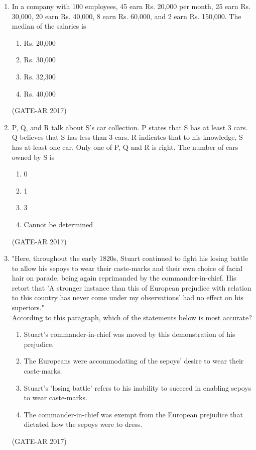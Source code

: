 \documentclass[a4paper,10pt]{article}
\begin{document}
\begin{enumerate}
    \item In a company with 100 employees, 45 earn Rs. 20,000 per month, 25 earn Rs. 30,000, 20 earn Rs. 40,000, 8 earn Rs. 60,000, and 2 earn Rs. 150,000. The median of the salaries is 
    \begin{multicols}{4}
	\begin{enumerate}
        \item Rs. 20,000
        \item Rs. 30,000
        \item Rs. 32,300
        \item Rs. 40,000
    \end{enumerate}
	\end{multicols}
    \hfill (GATE-AR 2017)

    \item P, Q, and R talk about S's car collection. P states that S has at least 3 cars. Q believes that S has less than 3 cars. R indicates that to his knowledge, S has at least one car. Only one of P, Q and R is right. The number of cars owned by S is 
    \begin{multicols}{4}
	\begin{enumerate}
        \item 0
        \item 1
        \item 3
        \item Cannot be determined
    \end{enumerate}
	\end{multicols}
    \hfill (GATE-AR 2017)

    \item "Here, throughout the early 1820s, Stuart continued to fight his losing battle to allow his sepoys to wear their caste-marks and their own choice of facial hair on parade, being again reprimanded by the commander-in-chief. His retort that 'A stronger instance than this of European prejudice with relation to this country has never come under my observations' had no effect on his superiors." \\
    According to this paragraph, which of the statements below is most accurate?
    \begin{enumerate}
        \item Stuart's commander-in-chief was moved by this demonstration of his prejudice.
        \item The Europeans were accommodating of the sepoys' desire to wear their caste-marks.
        \item Stuart's 'losing battle' refers to his inability to succeed in enabling sepoys to wear caste-marks.
        \item The commander-in-chief was exempt from the European prejudice that dictated how the sepoys were to dress.
    \end{enumerate}
    \hfill (GATE-AR 2017)


\end{enumerate}
\end{document}
